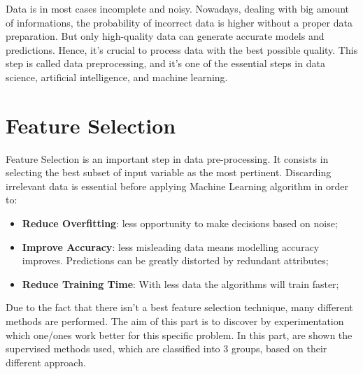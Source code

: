 Data is in most cases incomplete and noisy.
Nowadays, dealing with big amount of informations, the probability of incorrect data is higher without a proper data preparation. 
But only high-quality data can generate accurate models and predictions. Hence, it’s crucial to process data with the best possible quality. This step is called data preprocessing, and it’s one of the essential steps in data science, artificial intelligence, and machine learning.
\section{Feature Selection}
Feature Selection is an important step in data pre-processing. It consists in selecting the best subset of input variable as the most pertinent. Discarding irrelevant data is essential before applying Machine Learning algorithm in order to:
\begin{itemize}
\item \textbf{Reduce Overfitting}: less opportunity to make decisions based on noise;
\item \textbf{Improve Accuracy}: less misleading data means modelling accuracy improves. Predictions can be greatly distorted by redundant attributes;
\item \textbf{Reduce Training Time}: With less data the algorithms will train faster;
\end{itemize}
Due to the fact that there isn’t a best feature selection technique, many different methods are performed. The aim of this part is to discover by experimentation which one/ones work better for this specific problem. 
In this part, are shown the supervised methods used, which are classified into 3 groups, based on their  different approach.

